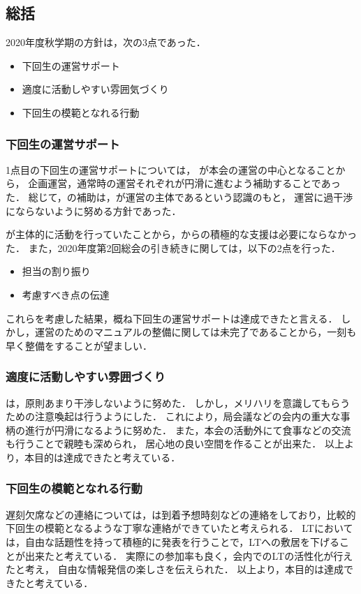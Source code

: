 \subsection*{\thirdGrade{}総括}


2020年度秋学期の\thirdGrade{}方針は，次の3点であった．
\begin {itemize}
	\item 下回生の運営サポート
	\item 適度に活動しやすい雰囲気づくり
    \item 下回生の模範となれる行動
\end {itemize}

\subsubsection*{下回生の運営サポート}

1点目の下回生の運営サポートについては，
\secondGrade{}が本会の運営の中心となることから，
企画運営，通常時の運営それぞれが円滑に進むよう補助することであった．
総じて，\thirdGrade{}の補助は，\secondGrade{}が運営の主体であるという認識のもと，
運営に過干渉にならないように努める方針であった．

\secondGrade{}が主体的に活動を行っていたことから，\thirdGrade{}からの積極的な支援は必要にならなかった．
また，2020年度第2回総会の引き続きに関しては，以下の2点を行った．

\begin {itemize}
	\item 担当の割り振り
	\item 考慮すべき点の伝達
\end {itemize}

これらを考慮した結果，概ね下回生の運営サポートは達成できたと言える．
しかし，運営のためのマニュアルの整備に関しては未完了であることから，一刻も早く整備をすることが望ましい．

\subsubsection*{適度に活動しやすい雰囲づくり}
\thirdGrade{}は，原則あまり干渉しないように努めた．
しかし，メリハリを意識してもらうための注意喚起は行うようにした．
これにより，局会議などの会内の重大な事柄の進行が円滑になるように努めた．
また，本会の活動外にて食事などの交流も行うことで親睦も深められ，
居心地の良い空間を作ることが出来た．
以上より，本目的は達成できたと考えている．

\subsubsection*{下回生の模範となれる行動}
遅刻欠席などの連絡については，\thirdGrade{}は到着予想時刻などの連絡をしており，比較的下回生の模範となるような丁寧な連絡ができていたと考えられる．
LTにおいては，自由な話題性を持って積極的に発表を行うことで，LTへの敷居を下げることが出来たと考えている．
実際に\firstGrade{}の参加率も良く，会内でのLTの活性化が行えたと考え，
自由な情報発信の楽しさを伝えられた．
以上より，本目的は達成できたと考えている．
